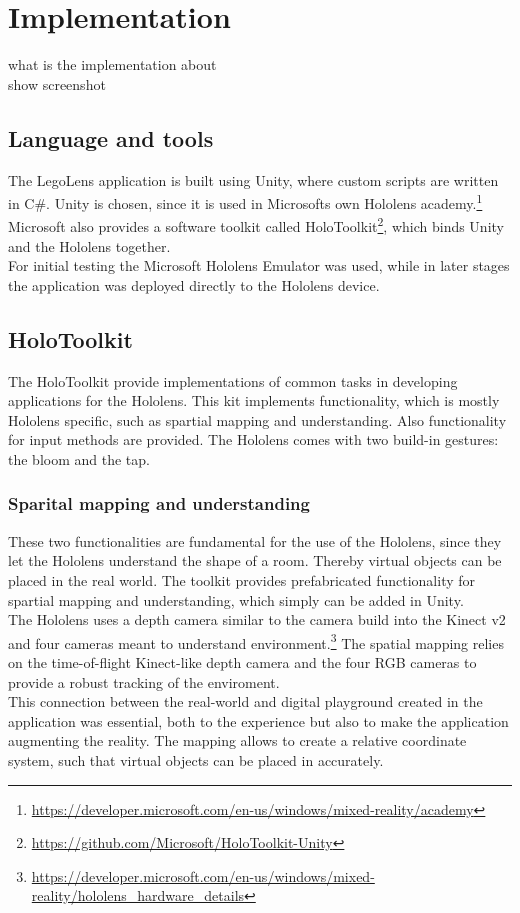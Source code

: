 \section{Implementation}
what is the implementation about\\
show screenshot\\


\subsection{Language and tools}
The LegoLens application is built using Unity, where custom scripts are written in C\#. Unity is chosen, since it is used in Microsofts own Hololens academy.\footnote{\url{https://developer.microsoft.com/en-us/windows/mixed-reality/academy}} Microsoft also provides a software toolkit called HoloToolkit\footnote{\url{https://github.com/Microsoft/HoloToolkit-Unity}}, which binds Unity and the Hololens together. \\
For initial testing the Microsoft Hololens Emulator was used, while in later stages the application was deployed directly to the Hololens device. 

\subsection{HoloToolkit}
The HoloToolkit provide implementations of common tasks in developing applications for the Hololens. This kit implements functionality, which is mostly Hololens specific, such as spartial mapping and understanding. Also functionality for input methods are provided. The Hololens comes with two build-in gestures: the bloom and the tap.

\subsubsection{Sparital mapping and understanding}
These two functionalities are fundamental for the use of the Hololens, since they let the Hololens understand the shape of a room. Thereby virtual objects can be placed in the real world. The toolkit provides prefabricated functionality for spartial mapping and understanding, which simply can be added in Unity.  \\
The Hololens uses a depth camera similar to the camera build into the Kinect v2 and four cameras meant to understand environment.\footnote{\url{https://developer.microsoft.com/en-us/windows/mixed-reality/hololens_hardware_details}} The spatial mapping relies on the time-of-flight Kinect-like depth camera and the four RGB cameras to provide a robust tracking of the enviroment. \\
This connection between the real-world and digital playground created in the application was essential, both to the experience but also to make the application augmenting the reality. The mapping allows to create a relative coordinate system, such that virtual objects can be placed in accurately.

